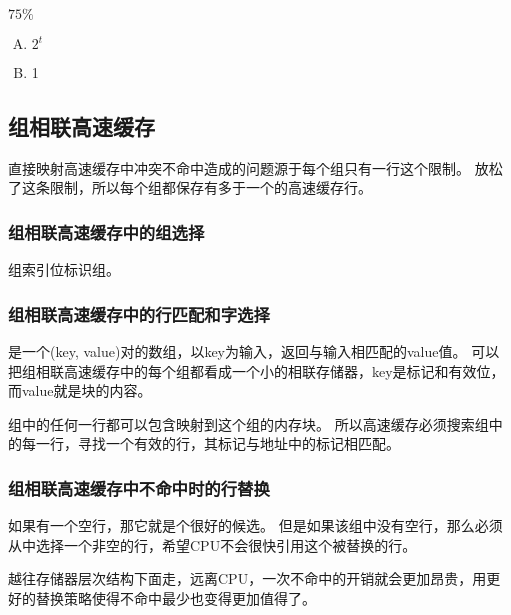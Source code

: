 {{        %
        \begin{practicec}
            $75\%$
        \end{practicec}

        \begin{practicec}
            \begin{enumerate}[A.]
                \item $2^t$
                \item 1
            \end{enumerate}
        \end{practicec}
    }

    \subsection{组相联高速缓存}
    {
        直接映射高速缓存中冲突不命中造成的问题源于每个组只有一行这个限制。
        放松了这条限制，所以每个组都保存有多于一个的高速缓存行。

        \subsubsection{组相联高速缓存中的组选择}
        {
            组索引位标识组。
        }

        \subsubsection{组相联高速缓存中的行匹配和字选择}
        {
            是一个(key, value)对的数组，以key为输入，返回与输入相匹配的value值。
            可以把组相联高速缓存中的每个组都看成一个小的相联存储器，key是标记和有效位，而value就是块的内容。

            组中的任何一行都可以包含映射到这个组的内存块。
            所以高速缓存必须搜索组中的每一行，寻找一个有效的行，其标记与地址中的标记相匹配。
        }

        \subsubsection{组相联高速缓存中不命中时的行替换}
        {
            如果有一个空行，那它就是个很好的候选。
            但是如果该组中没有空行，那么必须从中选择一个非空的行，希望CPU不会很快引用这个被替换的行。

            越往存储器层次结构下面走，远离CPU，一次不命中的开销就会更加昂贵，用更好的替换策略使得不命中最少也变得更加值得了。
        }
    }

}

